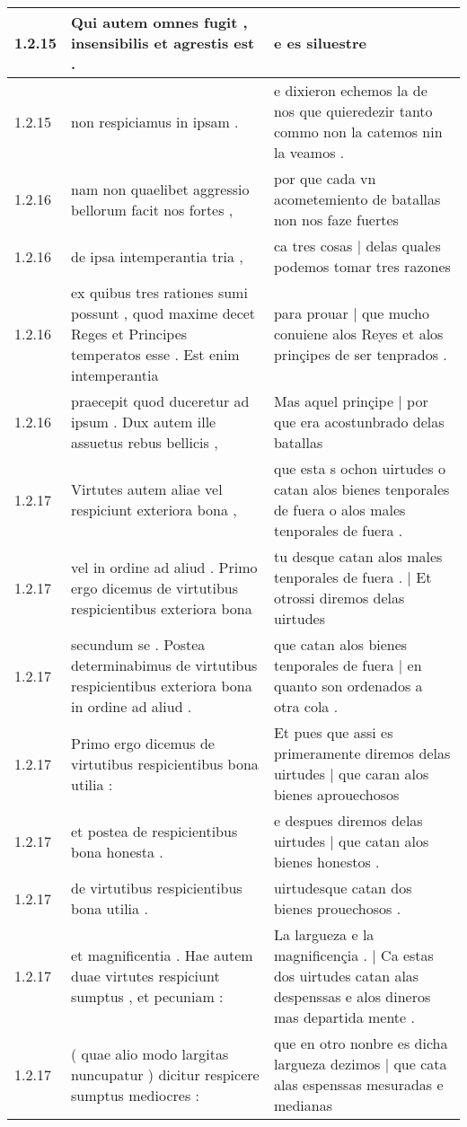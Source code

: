 \begin{tabular}{|p{1cm}|p{6.5cm}|p{6.5cm}|}
1.2.15 & Qui autem omnes fugit , insensibilis et agrestis est . & e es siluestre \\\hline
1.2.15 & non respiciamus in ipsam . & e dixieron echemos la de nos que quieredezir tanto commo non la catemos nin la veamos . \\\hline
1.2.16 & nam non quaelibet aggressio bellorum facit nos fortes , & por que cada vn acometemiento de batallas non nos faze fuertes \\\hline
1.2.16 & de ipsa intemperantia tria , & ca tres cosas | delas quales podemos tomar tres razones \\\hline
1.2.16 & ex quibus tres rationes sumi possunt , quod maxime decet Reges et Principes temperatos esse . Est enim intemperantia & para prouar | que mucho conuiene alos Reyes et alos prinçipes de ser tenprados . \\\hline
1.2.16 & praecepit quod duceretur ad ipsum . Dux autem ille assuetus rebus bellicis , & Mas aquel prinçipe | por que era acostunbrado delas batallas \\\hline
1.2.17 & Virtutes autem aliae vel respiciunt exteriora bona , & que esta s ochon uirtudes o catan alos bienes tenporales de fuera o alos males tenporales de fuera . \\\hline
1.2.17 & vel in ordine ad aliud . Primo ergo dicemus de virtutibus respicientibus exteriora bona & tu desque catan alos males tenporales de fuera . | Et otrossi diremos delas uirtudes \\\hline
1.2.17 & secundum se . Postea determinabimus de virtutibus respicientibus exteriora bona in ordine ad aliud . & que catan alos bienes tenporales de fuera | en quanto son ordenados a otra cola . \\\hline
1.2.17 & Primo ergo dicemus de virtutibus respicientibus bona utilia : & Et pues que assi es primeramente diremos delas uirtudes | que caran alos bienes aprouechosos \\\hline
1.2.17 & et postea de respicientibus bona honesta . & e despues diremos delas uirtudes | que catan alos bienes honestos . \\\hline
1.2.17 & de virtutibus respicientibus bona utilia . & uirtudesque catan dos bienes prouechosos . \\\hline
1.2.17 & et magnificentia . Hae autem duae virtutes respiciunt sumptus , et pecuniam : & La largueza e la magnificençia . | Ca estas dos uirtudes catan alas despenssas e alos dineros mas departida mente . \\\hline
1.2.17 & ( quae alio modo largitas nuncupatur ) dicitur respicere sumptus mediocres : & que en otro nonbre es dicha largueza dezimos | que cata alas espenssas mesuradas e medianas \\\hline

\end{tabular}
